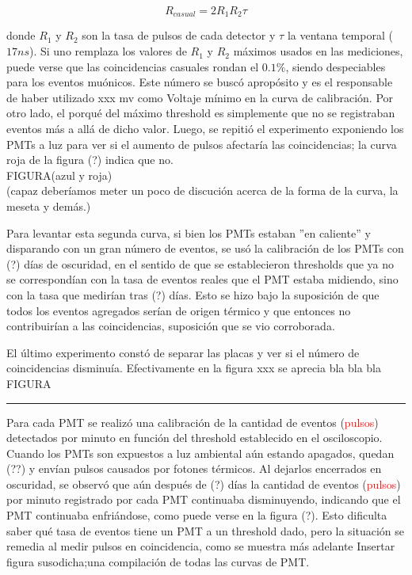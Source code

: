 \documentclass[12pt,a4paper]{article}
\numberwithin{equation}{section}
\begin{document}
\begin{equation}
R_{casual}= 2 R_1 R_2 \tau
\end{equation}

donde $ R_1 $ y $ R_2 $ son la tasa de pulsos de cada detector y $ \tau $ la ventana temporal ($ 17 ns $). Si uno remplaza los valores de $ R_1 $ y $ R_2 $ máximos usados en las mediciones, puede verse que las coincidencias casuales rondan el $ 0.1 \% $, siendo despeciables para los eventos muónicos. Este número se buscó apropósito y es el responsable de haber utilizado xxx mv como Voltaje mínimo en la curva de calibración. Por otro lado, el porqué del máximo threshold es simplemente que no se registraban eventos más a allá de dicho valor.
Luego, se repitió el experimento exponiendo los PMTs a luz para ver si el aumento de pulsos afectaría las coincidencias; la curva roja de la figura (?) indica que no.\\

FIGURA(azul y roja)\\

(capaz deberíamos meter un poco de discución acerca de la forma de la curva, la meseta y demás.)


Para levantar esta segunda curva, si bien los PMTs estaban ''en caliente'' y disparando con un gran número de eventos, se usó la calibración de los PMTs con (?) días de oscuridad, en el sentido de que se establecieron thresholds que ya no se correspondían con la tasa de eventos reales que el PMT estaba midiendo, sino con la tasa que medirían tras (?) días. Esto se hizo bajo la suposición de que todos los eventos agregados serían de origen térmico y que entonces no contribuirían a las coincidencias, suposición que se vio corroborada.

El último experimento constó de separar las placas y ver si el número de coincidencias disminuía. Efectivamente en la figura xxx se aprecia bla bla bla\\

FIGURA\\


\begin{center}
\rule{\textwidth}{0.2pt}
\end{center}

\vspace{50cm}

Para cada PMT se realizó una calibración de la cantidad de eventos (\textcolor{red}{pulsos}) detectados por minuto en función del threshold establecido en el osciloscopio. Cuando los PMTs son expuestos a luz ambiental aún estando apagados, quedan (??) y envían pulsos causados por fotones térmicos. Al dejarlos encerrados en oscuridad, se observó que aún después de (?) días la cantidad de eventos (\textcolor{red}{pulsos}) por minuto registrado por cada PMT continuaba disminuyendo, indicando que el PMT continuaba enfriándose, como puede verse en la figura (?). Esto dificulta saber qué tasa de eventos tiene un PMT a un threshold dado, pero la situación se remedia al medir pulsos en coincidencia, como se muestra más adelante
	Insertar figura susodicha;una compilación de todas las curvas de PMT.
\end{document}
